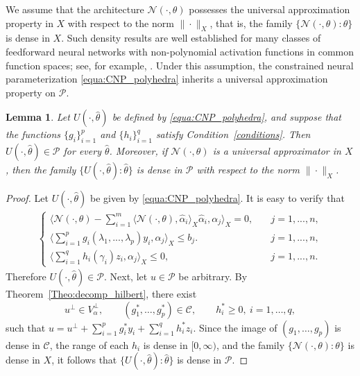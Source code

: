 \documentclass{article}
\numberwithin{equation}{section}
\newtheorem{lemma}{Lemma}[section]
\begin{document}
We assume that the architecture $\mathcal{N}(\cdot,\theta)$ possesses the universal approximation property in $X$ with respect to the norm $\|\cdot\|_X$, that is, the family $\{\mathcal{N}(\cdot,\theta):\theta\}$ is dense in $X$. Such density results are well established for many classes of feedforward neural networks with non-polynomial activation functions in common function spaces; see, for example, \cite{hornik1991approximation,hornik1993some,zhang2024deep}. Under this assumption, the constrained neural parameterization \eqref{equa:CNP_polyhedra} inherits a universal approximation property on $\mathcal{P}$.

\begin{lemma}
Let $U(\cdot,\hat{\theta})$ be defined by \eqref{equa:CNP_polyhedra}, and suppose that the functions $\{g_i\}_{i=1}^p$ and $\{h_i\}_{i=1}^q$ satisfy Condition~\ref{conditions}. Then $U(\cdot,\hat{\theta})\in\mathcal{P}$ for every $\hat{\theta}$. Moreover, if $\mathcal{N}(\cdot,\theta)$ is a universal approximator in $X$, then the family $\{U(\cdot,\hat{\theta}):\hat{\theta}\}$ is dense in $\mathcal{P}$ with respect to the norm $\|\cdot\|_X$.
\end{lemma}

\begin{proof}
Let $U(\cdot,\hat{\theta})$ be given by \eqref{equa:CNP_polyhedra}. It is easy to verify that
\begin{equation}
\begin{split}
    \begin{cases}
       \langle \mathcal{N}(\cdot,\theta)-\sum_{i=1}^m \langle \mathcal{N}(\cdot,\theta),\hat{\alpha}_i\rangle_X \hat{\alpha}_i,\alpha_j\rangle_X=0,\quad &j=1,...,n,\\
\langle \sum_{i=1}^p g_i(\lambda_1,...,\lambda_p) y_i,\alpha_j\rangle_X\le b_j.\quad &j=1,...,n,       \\
\langle\sum_{i=1}^q h_i(\gamma_i) z_i,\alpha_j\rangle_X\le 0,\quad & j=1,...,n.
    \end{cases}
    \end{split}
\end{equation}
Therefore $U(\cdot,\hat{\theta})\in \mathcal{P}$. Next, let $u\in\mathcal{P}$ be arbitrary. By Theorem~\ref{Theo:decomp_hilbert}, there exist
\[
u^\perp\in V_\alpha^\perp,\qquad (g_1^*,\dots,g_p^*)\in\mathcal{C},\qquad h_i^*\ge 0,\ i=1,\dots,q,
\]
such that $u=u^\perp+\sum_{i=1}^p g_i^* y_i+\sum_{i=1}^q h_i^* z_i$. Since the image of $(g_1,\dots,g_p)$ is dense in $\mathcal{C}$, the range of each $h_i$ is dense in $[0,\infty)$, and the family $\{\mathcal{N}(\cdot,\theta):\theta\}$ is dense in $X$, it follows that $\{U(\cdot,\hat{\theta}):\hat{\theta}\}$ is dense in $\mathcal{P}$.
\end{proof}
\end{document}
